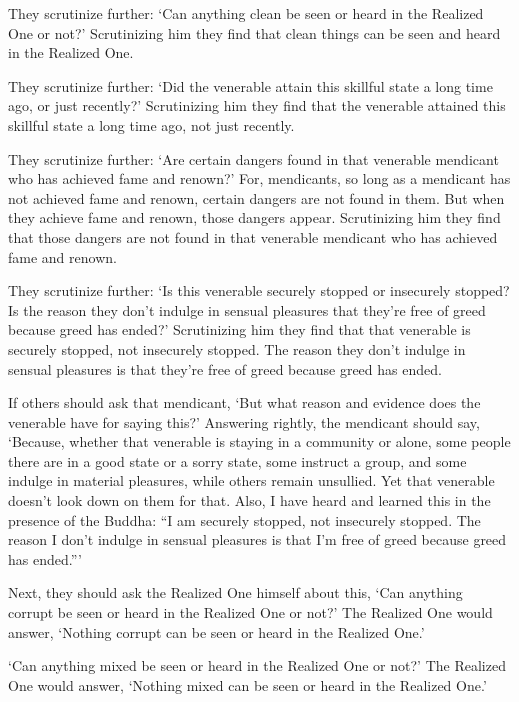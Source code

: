 \documentclass[12pt,openany]{book}%
\begin{document}
They scrutinize further: ‘Can anything clean be seen or heard in the Realized One or not?’ Scrutinizing him they find that clean things can be seen and heard in the Realized One. 

They scrutinize further: ‘Did the venerable attain this skillful state a long time ago, or just recently?’ Scrutinizing him they find that the venerable attained this skillful state a long time ago, not just recently. 

They scrutinize further: ‘Are certain dangers found in that venerable mendicant who has achieved fame and renown?’ For, mendicants, so long as a mendicant has not achieved fame and renown, certain dangers are not found in them. But when they achieve fame and renown, those dangers appear. Scrutinizing him they find that those dangers are not found in that venerable mendicant who has achieved fame and renown. 

They scrutinize further: ‘Is this venerable securely stopped or insecurely stopped? Is the reason they don’t indulge in sensual pleasures that they’re free of greed because greed has ended?’ Scrutinizing him they find that that venerable is securely stopped, not insecurely stopped. The reason they don’t indulge in sensual pleasures is that they’re free of greed because greed has ended. 

If others should ask that mendicant, ‘But what reason and evidence does the venerable have for saying this?’ Answering rightly, the mendicant should say, ‘Because, whether that venerable is staying in a community or alone, some people there are in a good state or a sorry state, some instruct a group, and some indulge in material pleasures, while others remain unsullied. Yet that venerable doesn’t look down on them for that. Also, I have heard and learned this in the presence of the Buddha: “I am securely stopped, not insecurely stopped. The reason I don’t indulge in sensual pleasures is that I’m free of greed because greed has ended.”’ 

Next, they should ask the Realized One himself about this, ‘Can anything corrupt be seen or heard in the Realized One or not?’ The Realized One would answer, ‘Nothing corrupt can be seen or heard in the Realized One.’ 

‘Can anything mixed be seen or heard in the Realized One or not?’ The Realized One would answer, ‘Nothing mixed can be seen or heard in the Realized One.’ 
\end{document}
